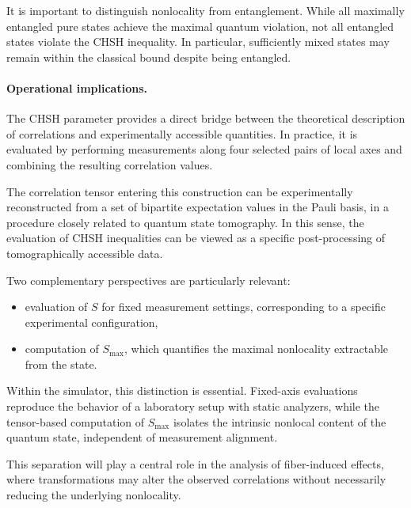 \documentclass[a4paper]{article}
\begin{document}
It is important to distinguish nonlocality from entanglement. While all maximally entangled pure states achieve the maximal quantum violation, not all entangled states violate the CHSH inequality. In particular, sufficiently mixed states may remain within the classical bound despite being entangled.

\medskip

\paragraph{Operational implications.}

The CHSH parameter provides a direct bridge between the theoretical description of correlations and experimentally accessible quantities. In practice, it is evaluated by performing measurements along four selected pairs of local axes and combining the resulting correlation values.

\medskip

The correlation tensor entering this construction can be experimentally reconstructed from a set of bipartite expectation values in the Pauli basis, in a procedure closely related to quantum state tomography. In this sense, the evaluation of CHSH inequalities can be viewed as a specific post-processing of tomographically accessible data.

\medskip

Two complementary perspectives are particularly relevant:

\begin{itemize}
    \item evaluation of \( S \) for fixed measurement settings, corresponding to a specific experimental configuration,
    \item computation of \( S_{\max} \), which quantifies the maximal nonlocality extractable from the state.
\end{itemize}

\medskip

Within the simulator, this distinction is essential. Fixed-axis evaluations reproduce the behavior of a laboratory setup with static analyzers, while the tensor-based computation of \( S_{\max} \) isolates the intrinsic nonlocal content of the quantum state, independent of measurement alignment.

\medskip

This separation will play a central role in the analysis of fiber-induced effects, where transformations may alter the observed correlations without necessarily reducing the underlying nonlocality.
\end{document}
